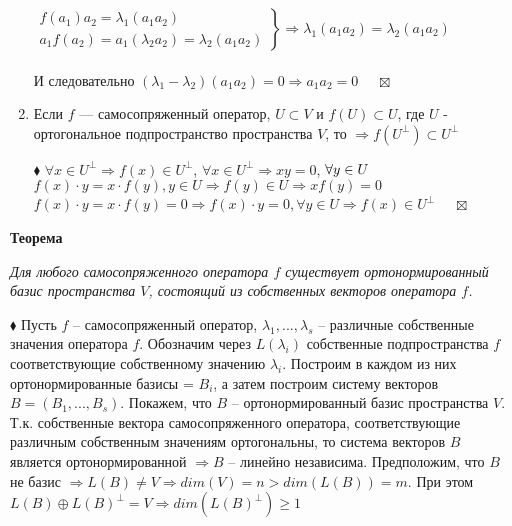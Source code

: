 \documentclass[a4paper, 12pt]{report}
\begin{document}
\begin{enumerate}
		$\left.\begin{matrix}
			f(a_1)a_2=\lambda_1(a_1a_2)\\
			a_1f(a_2)=a_1(\lambda_2a_2)=\lambda_2(a_1a_2)
		\end{matrix}\right\}\Rightarrow \lambda_1(a_1a_2)=\lambda_2(a_1a_2)$\\\\
		И следовательно $(\lambda_1-\lambda_2)(a_1a_2)=0\Rightarrow a_1a_2=0$
		$\quad\boxtimes$
		\item  Если $f$ --- самосопряженный оператор, $U \subset V$ и $f(U)\subset U$, где $U$ - ортогональное подпространство пространства $V$, то $\Rightarrow f(U^\perp)\subset U^\perp $
		\par\bigskip
		$\blacklozenge$
		$\forall x \in U^\perp \Rightarrow f(x)\in U^\perp$, $\forall x \in U^\perp \Rightarrow xy=0$, $\forall y \in U \\$\\
		$f(x)\cdot y=x\cdot f(y), y \in U \Rightarrow f(y) \in U\Rightarrow xf(y)=0$\\
		$f(x)\cdot y=x\cdot f(y)=0\Rightarrow f(x)\cdot y = 0, \forall y \in U\Rightarrow f(x) \in U^\perp $
		$\quad\boxtimes$
	\end{enumerate}
	
	\textbf{Теорема}
	
	\textit{Для любого самосопряженного оператора $f$ существует ортонормированный базис пространства $V$, состоящий из собственных векторов оператора $f$.}
	\par\bigskip
	$\blacklozenge$
	Пусть $f$ – самосопряженный оператор, $\lambda_1, ..., \lambda_s$ – различные собственные значения оператора $f$. Обозначим через $L(\lambda_i)$ собственные подпространства $f$ соответствующие собственному значению $\lambda_i$. Построим в каждом из них ортонормированные базисы = $B_i$, а затем построим систему векторов $B = (B_1, ..., B_s)$. Покажем, что $B$ – ортонормированный базис пространства $V$.\\
	Т.к. собственные вектора самосопряженного оператора, соответствующие различным собственным значениям ортогональны, то система векторов $B$ является ортонормированной  $\Rightarrow B$ – линейно независима. Предположим, что $B$ не базис $\Rightarrow L(B) \neq V \Rightarrow dim(V) = n > dim(L(B)) = m$. При этом $L(B) \oplus L(B)^\perp = V \Rightarrow dim(L(B)^\perp)\geqslant 1$\\
	
\end{document}

